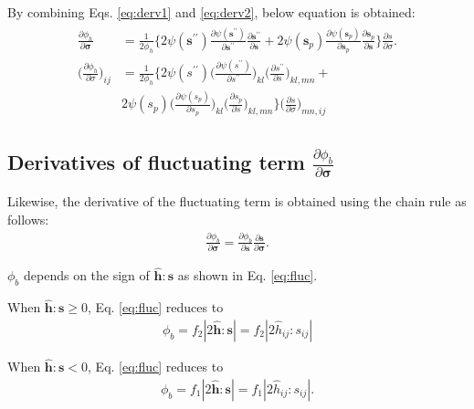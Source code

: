 \documentclass[12pt]{amsart}
\begin{document}
By combining Eqs. \ref{eq:derv1} and \ref{eq:derv2}, below equation is obtained:
\begin{eqnarray}
  \label{eq:derv3}
  \begin{split}
  \frac{\partial{\phi_h}}{\partial{\mathbf{\sigma}}} &=\frac{1}{2\phi_h}\bigg\{ 2\psi(\mathbf{s}^{\prime\prime})\frac{\partial{\psi(\mathbf{s}^{\prime\prime})}}{\partial{\mathbf{s}^{\prime\prime}}}  \frac{\partial\mathbf{s}^{\prime\prime}}{\partial \mathbf{s}} + 2\psi(\mathbf{s}_p) \frac{\partial{\psi(\mathbf{s}_p)}}{\partial{\mathbf{s}_p}} \frac{\partial{\mathbf{s}_p}}{\partial{\mathbf{s}}}\bigg\} \frac{\partial{s}}{\partial{\sigma}}.\\
  \Big(\frac{\partial{\phi_h}}{\partial\sigma}\Big)_{ij} &= \frac{1}{2\phi_h}\bigg\{ 2\psi(s^{\prime\prime})\Big(\frac{\partial{\psi(s^{\prime\prime})}}{\partial{s^{\prime\prime}}}\Big)_{kl}  \Big(\frac{\partial s^{\prime\prime}}{\partial s}\Big)_{kl,mn} + \\
    & 2\psi(s_p) \Big(\frac{\partial{\psi(s_p)}}{\partial{s_p}}\Big)_{kl} \Big(\frac{\partial{s_p}}{\partial s}\Big)_{kl,mn}\bigg\} \Big(\frac{\partial s}{\partial \sigma}\Big)_{mn,ij}
  \end{split}
\end{eqnarray}


\subsection{Derivatives of fluctuating term $\frac{\partial{\phi_b}  }{\partial{\mathbf{\sigma}}}$}
\label{sec:2.2}


Likewise, the derivative of the fluctuating term is obtained using the chain rule as follows:
\begin{eqnarray}
  \label{eq:derv4}
  \frac{\partial{\phi_b}  }{\partial{\mathbf{\sigma}}}  =   \frac{\partial{\phi_b}}{\partial{\mathbf{s}}} \frac{\partial{\mathbf{s}}}{\partial{\mathbf{\sigma}}}.
\end{eqnarray}

$\phi_b$ depends on the sign of $\hat{\mathbf{h}}:\mathbf{s}$ as shown in Eq. \ref{eq:fluc}.

When $\hat{\mathbf{h}}:\mathbf{s}\ge0$, Eq. \ref{eq:fluc} reduces to
\begin{eqnarray}
    \label{eq:fluc1}
\phi_b =f_2|2\hat{\mathbf{h}}:\mathbf{s}|=f_2|2\hat{h}_{ij}:s_{ij}|
\end{eqnarray}


When $\hat{\mathbf{h}}:\mathbf{s}<0$, Eq. \ref{eq:fluc} reduces to
\begin{eqnarray}
    \label{eq:fluc2}
\phi_b  =f_1|2\hat{\mathbf{h}}:\mathbf{s}|=f_1|2\hat{h}_{ij}:s_{ij}|.
\end{eqnarray}
\end{document}
